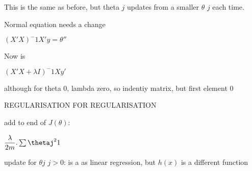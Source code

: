This is the same as before, but theta \(j\) updates from a smaller \(\theta \) \(j\) each time.

Normal equation needs a change

\((X'X)^-1X'y=\theta''\)

Now is

\((X'X+\lambda I)^-1X y'\)

although for theta 0, lambda zero, so indentiy matrix, but first element 0

REGULARISATION FOR REGULARISATION

add to end of \(J(\theta)\):

\(\dfrac{\lambda }{2m} .\sum \thetaj^21\)

update for \(\theta \)\(j\) \(j>0\):
is a as linear regression, but \(h(x)\) is a different function

